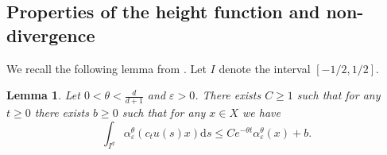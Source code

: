 \documentclass[12pt,reqno]{amsart}
\numberwithin{equation}{section}
\theoremstyle{plain}
\newtheorem{lem}[thm]{Lemma}
\theoremstyle{definition}
\theoremstyle{remark}
\newcommand{\eps}{\varepsilon}
\newcommand{\de}{\mathrm{d}}
\begin{document}
\subsection{Properties of the height function and non-divergence}

We recall the following lemma from \cite[Lemma 3.4]{SY24TAMS}. Let $I$ denote the interval $[-1/2,1/2]$. 
    
	\begin{lem}\label{lem:contraction_alpha}
		Let $0<\theta<\frac{d}{d+1}$ and $\eps>0$. There exists $C\geq 1$ such that for any $t\geq0$ there exists $b\geq 0$ such that for any $x\in X$ we have
		\begin{equation}\label{eq:contraction hypothesis alphaEpsTheta}
		\int_{I^d}\alpha_\eps^{\theta}(c_tu(s)x)\de s\leq
		Ce^{-\theta t}\alpha_\eps^{\theta}(x)+b.
		\end{equation}
	\end{lem}
\end{document}
